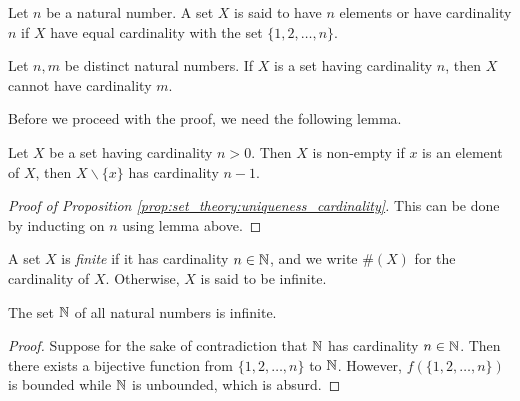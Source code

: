 \begin{defn}
Let $n$ be a natural number. 
A set $X$ is said to have $n$ elements or have cardinality $n$ if $X$ have 
equal cardinality with the set $\{1, 2, \ldots, n\}$. 
\end{defn}

\begin{prop}
\label{prop:set_theory:uniqueness_cardinality}
Let $n, m$ be distinct natural numbers. 
If $X$ is a set having cardinality $n$, then $X$ cannot have cardinality $m$. 
\end{prop}

Before we proceed with the proof, we need the following lemma. 
\begin{lemma}
Let $X$ be a set having cardinality $n > 0$. 
Then $X$ is non-empty if $x$ is an element of $X$, then $X \backslash \{x\}$ 
has cardinality $n - 1$. 
\end{lemma}
\begin{proof}[Proof of Proposition \ref{prop:set_theory:uniqueness_cardinality}]
This can be done by inducting on $n$ using lemma above. 
\end{proof}

\begin{defn}
A set $X$ is \emph{finite} if it has cardinality $n \in \mathbb{N}$, and we write 
$\#(X)$ for the cardinality of $X$. 
Otherwise, $X$ is said to be infinite. 
\end{defn}

\begin{prop}
The set $\mathbb{N}$ of all natural numbers is infinite. 
\end{prop}
\begin{proof}
Suppose for the sake of contradiction that $\mathbb{N}$ has cardinality $n \in \mathbb{N}$. 
Then there exists a bijective function from $\{1, 2, \ldots, n\}$ to $\mathbb{N}$. 
However, $f(\{1, 2, \ldots, n\})$ is bounded while $\mathbb{N}$ is unbounded, which 
is absurd. 
\end{proof}

